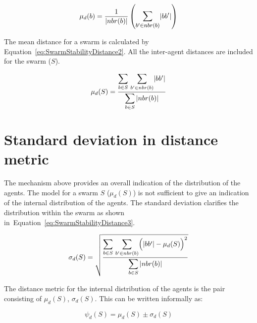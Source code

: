 \documentclass{ieeeaccess}
\begin{document}
\begin{equation}
\label{eq:SwarmStabilityDistance1}
\mu_d(b) = \frac{1}{\mathlarger{|nbr(b)|}}\left({\mathlarger{\sum_{b' \in nbr(b)}}|bb'|}\right)
\end{equation}

The mean distance for a swarm is calculated by Equation~\ref{eq:SwarmStabilityDistance2}. All the inter-agent distances are included for the swarm ($S$). 


\begin{equation}
\label{eq:SwarmStabilityDistance2}
\mu_d(S) = \frac{\mathlarger{\sum_{b \in S}}~\mathlarger{\sum_{b' \in nbr(b)}}|bb'|}{\mathlarger{\sum_{b \in S}|nbr(b)|}}
\end{equation}

\section{Standard deviation in distance metric}\label{Section:VarianceInDistance}
The mechanism above provides an overall indication of the distribution of the agents. The model for a swarm $S$ ($\mu_d(S)$) is not sufficient to give an indication of the internal distribution of the agents. The standard deviation clarifies the distribution within the swarm as shown in~Equation~\ref{eq:SwarmStabilityDistance3}. 


\begin{equation}
\label{eq:SwarmStabilityDistance3}
\sigma_d(S) = \sqrt{\frac{\mathlarger{\sum_{b \in S}}~\mathlarger{\sum_{b' \in nbr(b)}}\Big(|bb'| - \mu_d(S)\Big)^2}{\mathlarger{\sum_{b \in S}|nbr(b)|}}}
\end{equation}

The distance metric for the internal distribution of the agents is the pair consisting of $\mu_d(S)$, $\sigma_d(S)$. This can be written informally as:

\begin{equation}
\label{eq:SwarmPotentialMagnitude}
\psi_d(S) = \mu_d(S)\pm \sigma_d(S)
\end{equation}
\end{document}
